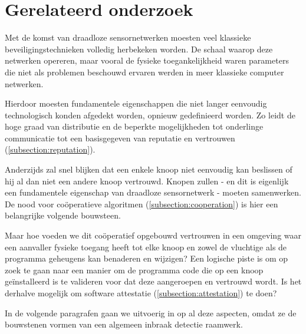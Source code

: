 \section{Gerelateerd onderzoek}
\label{section:related}

Met de komst van draadloze sensornetwerken moesten veel klassieke
beveiligingstechnieken volledig herbekeken worden. De schaal waarop deze
netwerken opereren, maar vooral de fysieke toegankelijkheid waren parameters
die niet als problemen beschouwd ervaren werden in meer klassieke computer
netwerken.

Hierdoor moesten fundamentele eigenschappen die niet langer eenvoudig
technologisch konden afgedekt worden, opnieuw gedefinieerd worden. Zo leidt de
hoge graad van distributie en de beperkte mogelijkheden tot onderlinge
communicatie tot een basisgegeven van reputatie en vertrouwen
(\ref{subsection:reputation}).

Anderzijds zal snel blijken dat een enkele knoop niet eenvoudig kan beslissen
of hij al dan niet een andere knoop vertrouwd. Knopen zullen - en dit is
eigenlijk een fundamentele eigenschap van draadloze sensornetwerk - moeten
samenwerken. De nood voor co\"operatieve algoritmen
(\ref{subsection:cooperation}) is hier een belangrijke volgende bouwsteen.

Maar hoe voeden we dit co\"operatief opgebouwd vertrouwen in een omgeving waar
een aanvaller fysieke toegang heeft tot elke knoop en zowel de vluchtige als de
programma geheugens kan benaderen en wijzigen? Een logische piste is om op zoek
te gaan naar een manier om de programma code die op een knoop ge\"installeerd
is te valideren voor dat deze aangeroepen en vertrouwd wordt. Is het derhalve
mogelijk om software attestatie (\ref{subsection:attestation}) te doen?

\TODO

In de volgende paragrafen gaan we uitvoerig in op al deze aspecten, omdat ze de
bouwstenen vormen van een algemeen inbraak detectie raamwerk.





\TODO

\cite{maerien2012famos,aschenbruck2012security,afzal2012difisec,yue2012novel,kuang2010snds,blilat2012wireless,ramesh2012wireless,valero2012di,perrig2004security,zhang2000intrusion,djenouri2005survey,yu2008framework,rassam2011novel,da2005decentralized,kachirski2003effective,li2008group,mishra2004intrusion,krontiris2008lidea,ioannis2007towards,soliman2012comparative,wang2011integrated,zhijie2012intrusion,zhang2010outlier,krishnan2006intrusion,alrajeh2013intrusion,raza2013svelte,wagner2002mimicry,balasubramaniyan1998architecture,huang1999large,hughes2012looci,maerien2011sasha,paul2009safe,wu2012toward,maerien2013access,matthys2012component,marchang2008collaborative,huang2003cooperative,krontiris2008launching,du2006lad,garg2013candidate,naik2001software,panda2001data}
